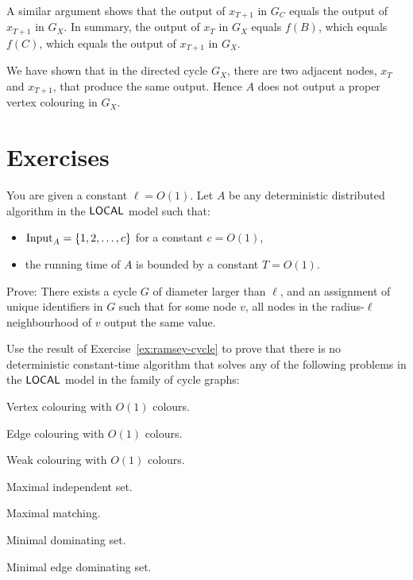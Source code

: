 A similar argument shows that the output of $x_{T+1}$ in $G_C$ equals the output of $x_{T+1}$ in $G_X$. In summary, the output of $x_{T}$ in $G_X$ equals $f(B)$, which equals $f(C)$, which equals the output of $x_{T+1}$ in $G_X$.

We have shown that in the directed cycle $G_X$, there are two adjacent nodes, $x_T$ and $x_{T+1}$, that produce the same output. Hence $A$ does not output a proper vertex colouring in $G_X$.


\section{Exercises}

\begin{ex}\label{ex:ramsey-cycle}
    You are given a constant $\ell = O(1)$. Let $A$ be any deterministic distributed algorithm in the $\textup{\sffamily LOCAL}$ model such that:
    \begin{itemize}[noitemsep]
        \item $\operatorname{Input}_A = \{1,2,\dotsc,c\}$ for a constant $c = O(1)$,
        \item the running time of $A$ is bounded by a constant $T = O(1)$.
    \end{itemize}
    Prove: There exists a cycle $G$ of diameter larger than $\ell$, and an assignment of unique identifiers in $G$ such that for some node $v$, all nodes in the radius-$\ell$ neighbourhood of $v$ output the same value.
\end{ex}

\begin{ex}\label{ex:ramsey-cycle-app}
    Use the result of Exercise~\ref{ex:ramsey-cycle} to prove that there is no deterministic constant-time algorithm that solves any of the following problems in the $\textup{\sffamily LOCAL}$ model in the family of cycle graphs:
    \begin{subex}[noitemsep]
        \item Vertex colouring with $O(1)$ colours.
        \item Edge colouring with $O(1)$ colours.
        \item Weak colouring with $O(1)$ colours.
        \item Maximal independent set.
        \item Maximal matching.
        \item Minimal dominating set.
        \item Minimal edge dominating set.
    \end{subex}
\end{ex}

